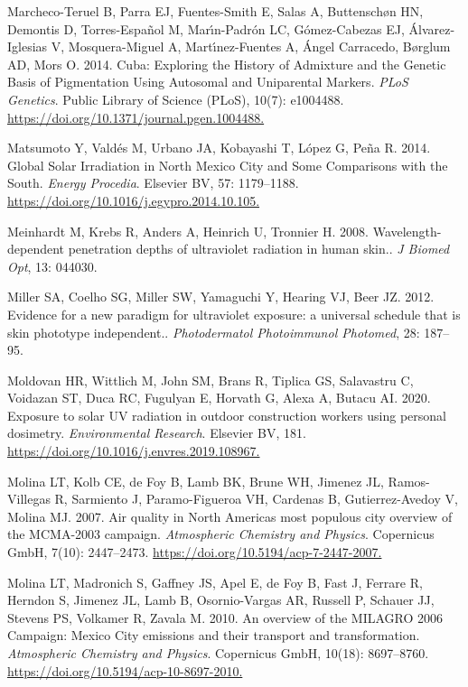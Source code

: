 \documentclass[10pt]{article}
\begin{document}
\label{csl:48}Marcheco-Teruel B, Parra EJ, Fuentes-Smith E, Salas A, Buttensch{\o}n HN, Demontis D, Torres-Espa{\~{n}}ol M, Mar{\'{\i}}n-Padr{\'{o}}n LC, G{\'{o}}mez-Cabezas EJ, {\'{A}}lvarez-Iglesias V, Mosquera-Miguel A, Mart{\'{\i}}nez-Fuentes A, {\'{A}}ngel Carracedo, B{\o}rglum AD, Mors O. 2014. {Cuba: Exploring the History of Admixture and the Genetic Basis of Pigmentation Using Autosomal and Uniparental Markers}. \textit{{PLoS} Genetics}. Public Library of Science ({PLoS}), 10(7): e1004488. \url{https://doi.org/10.1371/journal.pgen.1004488.}

\label{csl:17}Matsumoto Y, Vald{\'{e}}s M, Urbano JA, Kobayashi T, L{\'{o}}pez G, Pe{\~{n}}a R. 2014. {Global Solar Irradiation in North Mexico City and Some Comparisons with the South}. \textit{Energy Procedia}. Elsevier {BV}, 57: 1179–1188. \url{https://doi.org/10.1016/j.egypro.2014.10.105.}

\label{csl:35}Meinhardt M, Krebs R, Anders A, Heinrich U, Tronnier H. 2008. {Wavelength-dependent penetration depths of ultraviolet radiation in human skin.}. \textit{J Biomed Opt}, 13: 044030.

\label{csl:36}Miller SA, Coelho SG, Miller SW, Yamaguchi Y, Hearing VJ, Beer JZ. 2012. {Evidence for a new paradigm for ultraviolet exposure: a universal schedule that is skin phototype independent.}. \textit{Photodermatol Photoimmunol Photomed}, 28: 187–95.

\label{csl:54}Moldovan HR, Wittlich M, John SM, Brans R, Tiplica GS, Salavastru C, Voidazan ST, Duca RC, Fugulyan E, Horvath G, Alexa A, Butacu AI. 2020. {Exposure to solar {UV} radiation in outdoor construction workers using personal dosimetry}. \textit{Environmental Research}. Elsevier {BV}, 181. \url{https://doi.org/10.1016/j.envres.2019.108967.}

\label{csl:3}Molina LT, Kolb CE, de Foy B, Lamb BK, Brune WH, Jimenez JL, Ramos-Villegas R, Sarmiento J, Paramo-Figueroa VH, Cardenas B, Gutierrez-Avedoy V, Molina MJ. 2007. {Air quality in North America{\textquotesingle}s most populous city {\textendash} overview of the {MCMA}-2003 campaign}. \textit{Atmospheric Chemistry and Physics}. Copernicus {GmbH}, 7(10): 2447–2473. \url{https://doi.org/10.5194/acp-7-2447-2007.}

\label{csl:4}Molina LT, Madronich S, Gaffney JS, Apel E, de Foy B, Fast J, Ferrare R, Herndon S, Jimenez JL, Lamb B, Osornio-Vargas AR, Russell P, Schauer JJ, Stevens PS, Volkamer R, Zavala M. 2010. {An overview of the MILAGRO 2006 Campaign: Mexico City emissions and their transport and transformation}. \textit{Atmospheric Chemistry and Physics}. Copernicus GmbH, 10(18): 8697–8760. \url{https://doi.org/10.5194/acp-10-8697-2010.}
\end{document}
